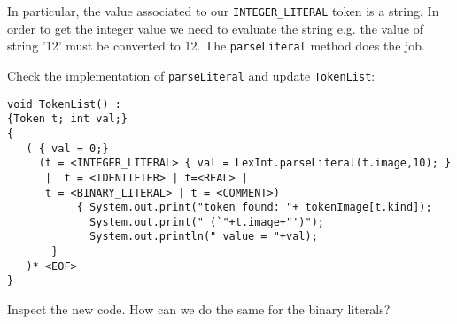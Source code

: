 \documentclass{article}
\begin{document}
In particular, the value associated to our \verb+INTEGER_LITERAL+ token is a string. In order to get the integer value we need to evaluate the string  e.g. the value of string '12' must be converted to 12. The {\tt parseLiteral} method does the job. 

Check the implementation of {\tt parseLiteral} and update {\tt TokenList}:

\begin{verbatim}
void TokenList() :
{Token t; int val;}
{
   ( { val = 0;}
     (t = <INTEGER_LITERAL> { val = LexInt.parseLiteral(t.image,10); }
      |  t = <IDENTIFIER> | t=<REAL> |
      t = <BINARY_LITERAL> | t = <COMMENT>)
           { System.out.print("token found: "+ tokenImage[t.kind]);
             System.out.print(" (`"+t.image+"')"); 
             System.out.println(" value = "+val); 
	   }
   )* <EOF>
}
\end{verbatim}

Inspect the new code. How can we do the same for the binary literals?
\end{document}
